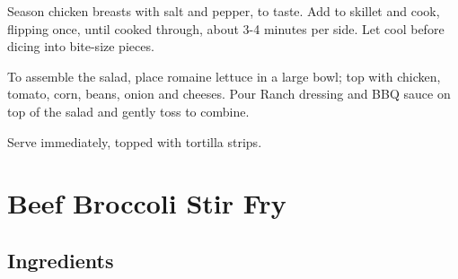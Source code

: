 \documentclass[ansiapaper,10pt,english]{sphinxmanual}
\begin{document}
Season chicken breasts with salt and pepper, to taste. Add to skillet and cook, flipping once, until cooked through, about 3-4 minutes per side. Let cool before dicing into bite-size pieces.

To assemble the salad, place romaine lettuce in a large bowl; top with chicken, tomato, corn, beans, onion and cheeses. Pour Ranch dressing and BBQ sauce on top of the salad and gently toss to combine.

Serve immediately, topped with tortilla strips.


\chapter{Beef Broccoli Stir Fry}
\label{\detokenize{Beef_Broc:beef-broccoli-stir-fry}}\label{\detokenize{Beef_Broc::doc}}

\section{Ingredients}
\label{\detokenize{Beef_Broc:ingredients}}
%
\begin{sphinxVerbatim}[commandchars=\\\{\}]
   

    

     

   

  

    

   

   

     

    

    
\end{sphinxVerbatim}
\end{document}
